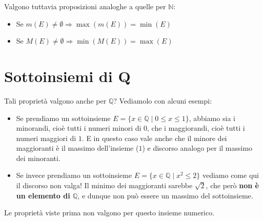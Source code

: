 \documentclass[12pt]{report}
\newcommand{\N}{\mathbb{N}}
\newcommand{\Q}{\mathbb{Q}}
\begin{document}
	Valgono tuttavia proposizioni analoghe a quelle per $\N$:
	\begin{itemize}
		
		\item Se $m(E) \neq \emptyset \Rightarrow \operatorname{max}(m(E)) = \min(E)$
		
		\item Se $M(E) \neq \emptyset \Rightarrow \operatorname{min}(M(E)) = \max(E)$
		
	\end{itemize}

	\section{Sottoinsiemi di Q}
	Tali proprietà valgono anche per $\Q$? Vediamolo con alcuni esempi:

	\begin{itemize}
		
		\item Se prendiamo un sottoinsieme $E = \{x \in \Q \mid 0 \leq x \leq 1\}$, abbiamo sia i minorandi, cioè tutti i numeri minori di $0$, che i maggiorandi, cioè tutti i numeri maggiori di $1$. E in questo caso vale anche che il minore dei maggioranti è il massimo dell'insieme ($1$) e discorso analogo per il massimo dei minoranti.
		
		\item Se invece prendiamo un sottoinsieme $E = \{x \in \Q \mid x^2 \leq 2\}$ vediamo come qui il discorso non valga! Il minimo dei maggioranti sarebbe $\sqrt{2}$, che però \textbf{non è un elemento di $\Q$}, e dunque non può essere un massimo del sottoinsieme.
		
	\end{itemize}

	Le proprietà viste prima non valgono per questo insieme numerico.
\end{document}
